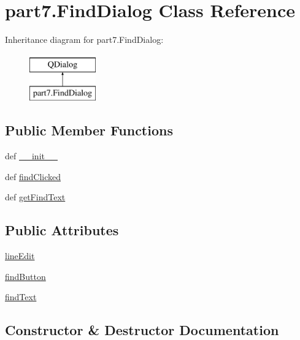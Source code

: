 \hypertarget{classpart7_1_1FindDialog}{}\section{part7.\+Find\+Dialog Class Reference}
\label{classpart7_1_1FindDialog}
Inheritance diagram for part7.\+Find\+Dialog\+:\begin{figure}[H]
\begin{center}
\leavevmode
\includegraphics[height=2.000000cm]{classpart7_1_1FindDialog}
\end{center}
\end{figure}
\subsection*{Public Member Functions}
\begin{DoxyCompactItemize}
\item 
def \hyperlink{classpart7_1_1FindDialog_a1c6a0ce42c7f5e1d1bde2a950047ca00}{\+\_\+\+\_\+init\+\_\+\+\_\+}
\item 
def \hyperlink{classpart7_1_1FindDialog_a675341cf6002eaa086416e1abae46133}{find\+Clicked}
\item 
def \hyperlink{classpart7_1_1FindDialog_ae7150776b2cd3456fa6f332bd4a1590b}{get\+Find\+Text}
\end{DoxyCompactItemize}
\subsection*{Public Attributes}
\begin{DoxyCompactItemize}
\item 
\hyperlink{classpart7_1_1FindDialog_a0daeb7ec4020fb076853e44bda9fc0b8}{line\+Edit}
\item 
\hyperlink{classpart7_1_1FindDialog_ad95a148888e590255ab56c3666465dbd}{find\+Button}
\item 
\hyperlink{classpart7_1_1FindDialog_a0abf01d5e2d803baa5694d2c59af9f8c}{find\+Text}
\end{DoxyCompactItemize}


\subsection{Constructor \& Destructor Documentation}
\hypertarget{classpart7_1_1FindDialog_a1c6a0ce42c7f5e1d1bde2a950047ca00}{}
